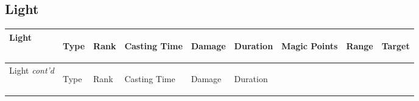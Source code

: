 \documentclass[twoside]{book}
\begin{document}
    

\subsection{Light}
    
\begin{longtable}{p{1.25in}lp{2em}p{3em}llp{7em}ll} 
  Light
  &
  \begin{turn}{70}{Type}\end{turn}
          
  &
  \begin{turn}{70}{Rank}\end{turn}
          
  &
  \begin{turn}{70}{Casting Time}\end{turn}
          
  &
  \begin{turn}{70}{Damage}\end{turn}
          
  &
  \begin{turn}{70}{Duration}\end{turn}
          
  &
  \begin{turn}{70}{Magic Points}\end{turn}
          
  &
  \begin{turn}{70}{Range}\end{turn}
          
  &
  \begin{turn}{70}{Target}\end{turn}
          
  \\
  \hline
  \hline
  \endfirsthead
  Light \textit{cont'd}
        
  &
  \begin{turn}{70}{Type}\end{turn}
          
  &
  \begin{turn}{70}{Rank}\end{turn}
          
  &
  \begin{turn}{70}{Casting Time}\end{turn}
          
  &
  \begin{turn}{70}{Damage}\end{turn}
          
  &
  \begin{turn}{70}{Duration}\end{turn}
          

\end{longtable}
\end{document}
